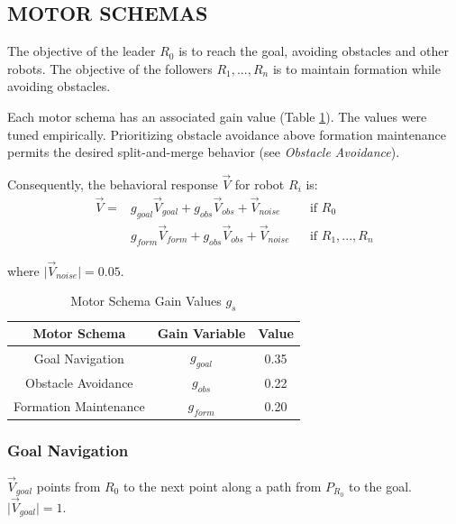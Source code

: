 \documentclass[letterpaper, 10 pt, conference]{ieeeconf}  %
\begin{document}
\subsection{MOTOR SCHEMAS}

The objective of the leader $R_0$ is to reach the goal, avoiding obstacles and other robots. The objective of the followers $R_1,...,R_n$ is to maintain formation while avoiding obstacles.

Each motor schema has an associated gain value (Table \ref{motor_schema_gs}). The values were tuned empirically. Prioritizing obstacle avoidance above formation maintenance permits the desired split-and-merge behavior (see \textit{Obstacle Avoidance}).

Consequently, the behavioral response $\vec{V}$ for robot $R_i$ is:
\begin{equation*}
\begin{aligned}
\vec{V} = & g_{goal} \vec{V}_{goal} + g_{obs} \vec{V}_{obs} + \vec{V}_{noise}    && \text{if $R_0$} \\
              & g_{form} \vec{V}_{form} + g_{obs} \vec{V}_{obs} + \vec{V}_{noise}   && \text{if $R_1,...,R_n$}
\end{aligned}
\end{equation*}

where $\lvert\vec{V}_{noise}\rvert = 0.05$.

\begin{table}[h]
\begin{center}
\begin{tabular}{|c|c|c|}
\hline
Motor Schema & Gain Variable & Value \\
\hline
Goal Navigation & $g_{goal}$ & 0.35 \\
Obstacle Avoidance & $g_{obs}$ & 0.22 \\
Formation Maintenance & $g_{form}$ & 0.20 \\
\hline
\end{tabular}
\end{center}
\caption{Motor Schema Gain Values $g_s$}
\label{motor_schema_gs}
\end{table}

\subsubsection*{Goal Navigation}

$\vec{V}_{goal}$ points from $R_0$ to the next point along a path from $P_{R_0}$ to the goal. $\vert\vec{V}_{goal}\rvert = 1$.
\end{document}
